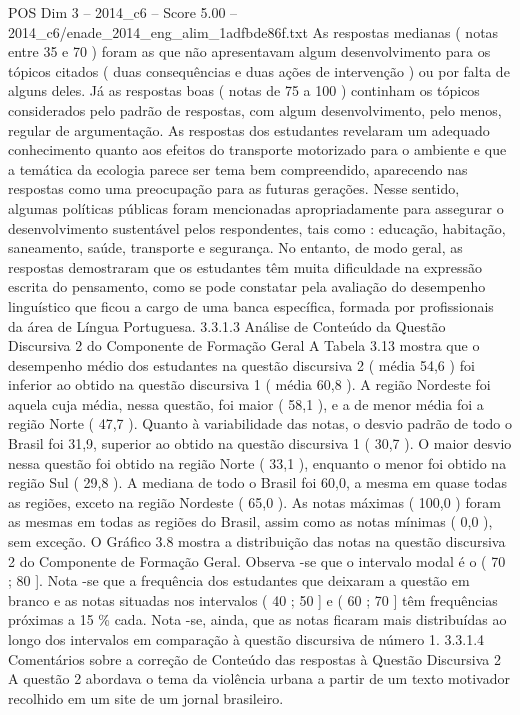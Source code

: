 \begin{textsample}{POS Dim 3 – 2014\_c6 – Score 5.00 – 2014\_c6/enade\_2014\_eng\_alim\_1adfbde86f.txt}
As respostas medianas ( notas entre 35 e 70 ) foram as que não apresentavam algum desenvolvimento para os tópicos citados ( duas consequências e duas ações de intervenção ) ou por falta de alguns deles.
Já as respostas boas ( notas de 75 a 100 ) continham os tópicos considerados pelo padrão de respostas, com algum desenvolvimento, pelo menos, regular de argumentação.
As respostas dos estudantes revelaram um adequado conhecimento quanto aos efeitos do transporte motorizado para o ambiente e que a temática da ecologia parece ser tema bem compreendido, aparecendo nas respostas como uma preocupação para as futuras gerações.
Nesse sentido, algumas políticas públicas foram mencionadas apropriadamente para assegurar o desenvolvimento sustentável pelos respondentes, tais como : educação, habitação, saneamento, saúde, transporte e segurança.
No entanto, de modo geral, as respostas demostraram que os estudantes têm muita dificuldade na expressão escrita do pensamento, como se pode constatar pela avaliação do desempenho linguístico que ficou a cargo de uma banca específica, formada por profissionais da área de Língua Portuguesa. 3.3.1.3 Análise de Conteúdo da Questão Discursiva 2 do Componente de Formação Geral A Tabela 3.13 mostra que o desempenho médio dos estudantes na questão discursiva 2 ( média 54,6 ) foi inferior ao obtido na questão discursiva 1 ( média 60,8 ).
A região Nordeste foi aquela cuja média, nessa questão, foi maior ( 58,1 ), e a de menor média foi a região Norte ( 47,7 ).
Quanto à variabilidade das notas, o desvio padrão de todo o Brasil foi 31,9, superior ao obtido na questão discursiva 1 ( 30,7 ).
O maior desvio nessa questão foi obtido na região Norte ( 33,1 ), enquanto o menor foi obtido na região Sul ( 29,8 ).
A mediana de todo o Brasil foi 60,0, a mesma em quase todas as regiões, exceto na região Nordeste ( 65,0 ).
As notas máximas ( 100,0 ) foram as mesmas em todas as regiões do Brasil, assim como as notas mínimas ( 0,0 ), sem exceção.
O Gráfico 3.8 mostra a distribuição das notas na questão discursiva 2 do Componente de Formação Geral.
Observa -se que o intervalo modal é o ( 70 ; 80 ].
Nota -se que a frequência dos estudantes que deixaram a questão em branco e as notas situadas nos intervalos ( 40 ; 50 ] e ( 60 ; 70 ] têm frequências próximas a 15 \% cada.
Nota -se, ainda, que as notas ficaram mais distribuídas ao longo dos intervalos em comparação à questão discursiva de número 1. 3.3.1.4 Comentários sobre a correção de Conteúdo das respostas à Questão Discursiva 2 A questão 2 abordava o tema da violência urbana a partir de um texto motivador recolhido em um site de um jornal brasileiro.

\end{textsample}
